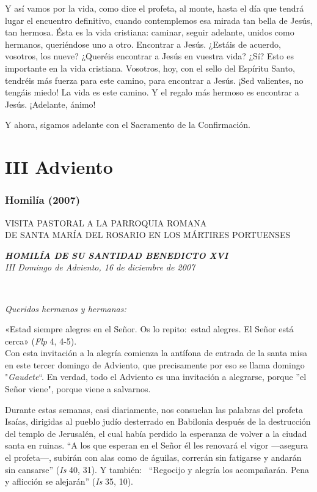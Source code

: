 Y así vamos por la vida, como dice el profeta, al monte, hasta el día
que tendrá lugar el encuentro definitivo, cuando contemplemos esa mirada
tan bella de Jesús, tan hermosa. Ésta es la vida cristiana: caminar,
seguir adelante, unidos como hermanos, queriéndose uno a otro. Encontrar
a Jesús. ¿Estáis de acuerdo, vosotros, los nueve? ¿Queréis encontrar a
Jesús en vuestra vida? ¿Sí? Esto es importante en la vida cristiana.
Vosotros, hoy, con el sello del Espíritu Santo, tendréis más fuerza para
este camino, para encontrar a Jesús. ¡Sed valientes, no tengáis miedo!
La vida es este camino. Y el regalo más hermoso es encontrar a Jesús.
¡Adelante, ánimo!

Y ahora, sigamos adelante con el Sacramento de la Confirmación.


\section{III Adviento}
\subsubsection{Homilía (2007)}
VISITA PASTORAL A LA PARROQUIA ROMANA\\
DE SANTA MARÍA DEL ROSARIO EN LOS MÁRTIRES PORTUENSES

\emph{\textbf{HOMILÍA DE SU SANTIDAD BENEDICTO XVI}\\[2\baselineskip]III
	Domingo de Adviento, 16 de diciembre de 2007}

~

\emph{Queridos hermanos y hermanas:}

«Estad siempre alegres en el Señor. Os lo repito:~estad alegres. El
Señor está cerca» (\emph{Flp} 4, 4-5).\\
Con esta invitación a la alegría comienza la antífona de entrada de la
santa misa en este tercer domingo de Adviento, que precisamente por eso
se llama domingo "\emph{Gaudete}``. En verdad, todo el Adviento es una
invitación a alegrarse, porque ''el Señor viene", porque viene a
salvarnos.

Durante estas semanas, casi diariamente, nos consuelan las palabras del
profeta Isaías, dirigidas al pueblo judío desterrado en Babilonia
después de la destrucción del templo de Jerusalén, el cual había perdido
la esperanza de volver a la ciudad santa en ruinas. ``A los que esperan
en el Señor él les renovará el vigor ---asegura el profeta---, subirán
con alas como de águilas, correrán sin fatigarse y andarán sin
cansarse'' (\emph{Is} 40, 31). Y también:~ ``Regocijo y alegría los
acompañarán. Pena y aflicción se alejarán'' (\emph{Is} 35, 10).

